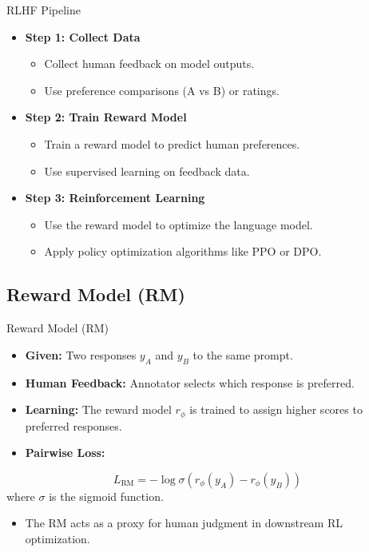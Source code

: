 \begin{frame}{RLHF Pipeline}
    \begin{itemize}
        \item \textbf{Step 1: Collect Data}
        \begin{itemize}
            \item Collect human feedback on model outputs.
            \item Use preference comparisons (A vs B) or ratings.
        \end{itemize}
        \item \textbf{Step 2: Train Reward Model}
        \begin{itemize}
            \item Train a reward model to predict human preferences.
            \item Use supervised learning on feedback data.
        \end{itemize}
        \item \textbf{Step 3: Reinforcement Learning}
        \begin{itemize}
            \item Use the reward model to optimize the language model.
            \item Apply policy optimization algorithms like PPO or DPO.
        \end{itemize}
    \end{itemize}
\end{frame}


\subsection{Reward Model (RM)}
\begin{frame}{Reward Model (RM)}
    \begin{itemize}
        \item \textbf{Given:} Two responses $y_A$ and $y_B$ to the same prompt.
        \item \textbf{Human Feedback:} Annotator selects which response is preferred.
        \item \textbf{Learning:} The reward model $r_\phi$ is trained to assign higher scores to preferred responses.
        \item \textbf{Pairwise Loss:}
    \end{itemize}
    \[
        L_{\mathrm{RM}} = -\log \sigma\left(r_\phi(y_A) - r_\phi(y_B)\right)
    \]
    where $\sigma$ is the sigmoid function.
    \begin{itemize}
        \item The RM acts as a proxy for human judgment in downstream RL optimization.
    \end{itemize}
\end{frame}



